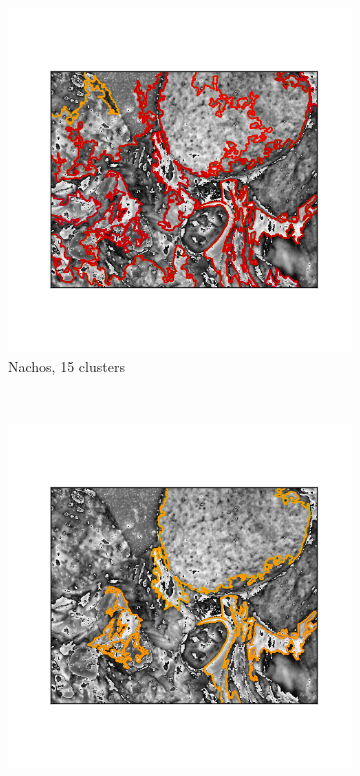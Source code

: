 \documentclass{article}
\begin{document}
\begin{figure}
            \begin{subfigure}[b]{0.3\textwidth}
                    \centering
                    \includegraphics[width=\textwidth]{nachosgray_crop_ward_15.png}
                    \caption{Nachos, 15 clusters}
                    \label{fig:nachos15}
            \end{subfigure}
            ~ %
            \begin{subfigure}[b]{0.3\textwidth}
                    \centering
                    \includegraphics[width=\textwidth]{nachosgray_crop_ward_5.png}

\end{subfigure}
\end{figure}
\end{document}
